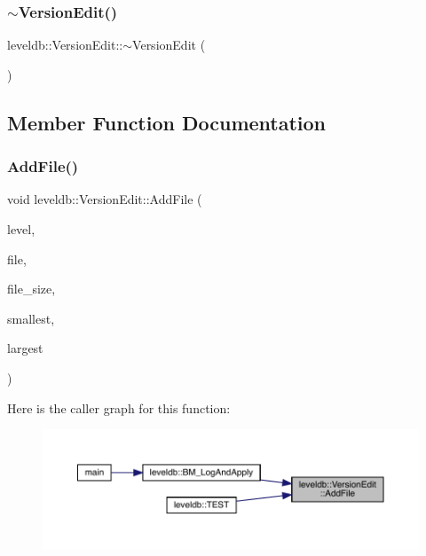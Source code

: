 \subsubsection{\texorpdfstring{$\sim$VersionEdit()}{~VersionEdit()}}
{\footnotesize\ttfamily leveldb\+::\+Version\+Edit\+::$\sim$\+Version\+Edit (\begin{DoxyParamCaption}{ }\end{DoxyParamCaption})\hspace{0.3cm}{\ttfamily [inline]}}



\subsection{Member Function Documentation}
\mbox{\label{classleveldb_1_1_version_edit_a4cd5cc92761b7ae5b5f9cff46cb88263}} 
\subsubsection{\texorpdfstring{AddFile()}{AddFile()}}
{\footnotesize\ttfamily void leveldb\+::\+Version\+Edit\+::\+Add\+File (\begin{DoxyParamCaption}\item[{int}]{level,  }\item[{uint64\+\_\+t}]{file,  }\item[{uint64\+\_\+t}]{file\+\_\+size,  }\item[{const \mbox{\hyperlink{classleveldb_1_1_internal_key}{Internal\+Key}} \&}]{smallest,  }\item[{const \mbox{\hyperlink{classleveldb_1_1_internal_key}{Internal\+Key}} \&}]{largest }\end{DoxyParamCaption})\hspace{0.3cm}{\ttfamily [inline]}}

Here is the caller graph for this function\+:
\nopagebreak
\begin{figure}[H]
\begin{center}
\leavevmode
\includegraphics[width=350pt]{classleveldb_1_1_version_edit_a4cd5cc92761b7ae5b5f9cff46cb88263_icgraph}
\end{center}
\end{figure}
\mbox{\label{classleveldb_1_1_version_edit_a259c9de14d58e231178904c1559e4b5e}} 
